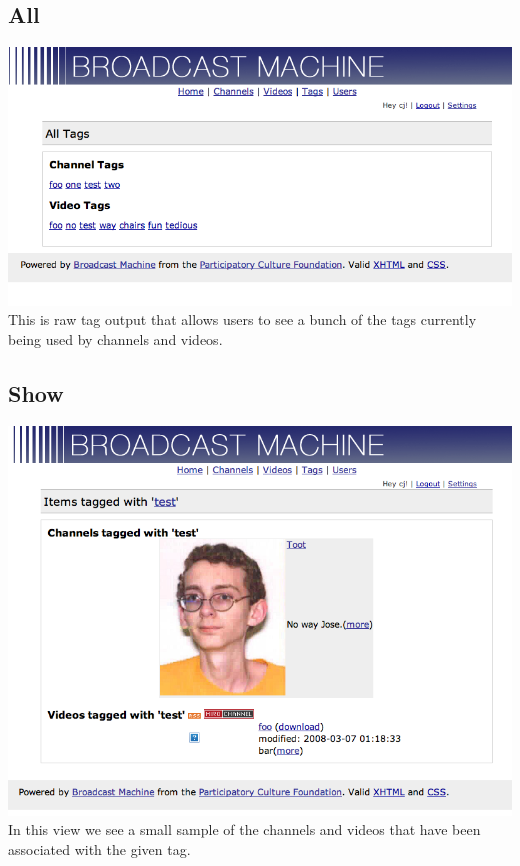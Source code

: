 \documentclass[a4paper,12pt]{report}
\begin{document}
\subsection{All}
\includegraphics{images/tagall.png}
This is raw tag output that allows users to see a bunch of the tags currently being used by channels and videos.

\subsection{Show}
\includegraphics{images/tagshow.png}
In this view we see a small sample of the channels and videos that have been associated with the given tag.
\end{document}
